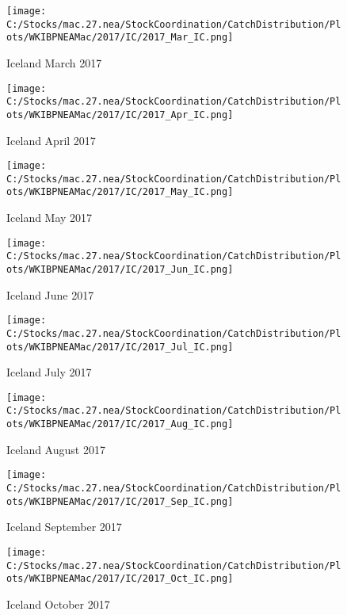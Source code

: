\documentclass{article}
\begin{document}
\begin{figure}
	\centering
		\texttt{[image: C:/Stocks/mac.27.nea/StockCoordination/CatchDistribution/Plots/WKIBPNEAMac/2017/IC/2017\_Mar\_IC.png]}
	\caption{Iceland March 2017}
	\label{fig:2017_Mar_IC}
\end{figure}

\begin{figure}
	\centering
		\texttt{[image: C:/Stocks/mac.27.nea/StockCoordination/CatchDistribution/Plots/WKIBPNEAMac/2017/IC/2017\_Apr\_IC.png]}
	\caption{Iceland April 2017}
	\label{fig:2017_Apr_IC}
\end{figure}

\begin{figure}
	\centering
		\texttt{[image: C:/Stocks/mac.27.nea/StockCoordination/CatchDistribution/Plots/WKIBPNEAMac/2017/IC/2017\_May\_IC.png]}
	\caption{Iceland May 2017}
	\label{fig:2017_May_IC}
\end{figure}

\begin{figure}
	\centering
		\texttt{[image: C:/Stocks/mac.27.nea/StockCoordination/CatchDistribution/Plots/WKIBPNEAMac/2017/IC/2017\_Jun\_IC.png]}
	\caption{Iceland June 2017}
	\label{fig:2017_Jun_IC}
\end{figure}

\begin{figure}
	\centering
		\texttt{[image: C:/Stocks/mac.27.nea/StockCoordination/CatchDistribution/Plots/WKIBPNEAMac/2017/IC/2017\_Jul\_IC.png]}
	\caption{Iceland July 2017}
	\label{fig:2017_Jul_IC}
\end{figure}

\begin{figure}
	\centering
		\texttt{[image: C:/Stocks/mac.27.nea/StockCoordination/CatchDistribution/Plots/WKIBPNEAMac/2017/IC/2017\_Aug\_IC.png]}
	\caption{Iceland August 2017}
	\label{fig:2017_Aug_IC}
\end{figure}

\begin{figure}
	\centering
		\texttt{[image: C:/Stocks/mac.27.nea/StockCoordination/CatchDistribution/Plots/WKIBPNEAMac/2017/IC/2017\_Sep\_IC.png]}
	\caption{Iceland September 2017}
	\label{fig:2017_Sep_IC}
\end{figure}

\begin{figure}
	\centering
		\texttt{[image: C:/Stocks/mac.27.nea/StockCoordination/CatchDistribution/Plots/WKIBPNEAMac/2017/IC/2017\_Oct\_IC.png]}
	\caption{Iceland October 2017}
	\label{fig:2017_Oct_IC}
\end{figure}
\end{document}
